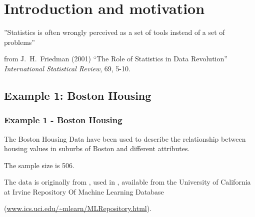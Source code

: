 \documentclass{beamer}
\newcommand{\bs}{\bigskip}
\begin{document}
\section{Introduction and motivation}
\begin{frame}
\begin{center}
{\color{blue}''Statistics is often wrongly perceived as a set of tools instead of a set of problems''}
\end{center}

\bs
\bs

from J.~H.~Friedman (2001) ``The Role of Statistics in Data Revolution'' \textit{International Statistical Review}, 69, 5-10.
\end{frame}

\subsection{Example 1: Boston Housing}

\begin{frame}
\frametitle{Example 1 - Boston Housing}

The Boston Housing Data have
  been used to describe the relationship between housing values in suburbs of
  Boston and different attributes.

\bs

The sample size is 506.

\bs

The data is originally from , used in
,  available from the University of California at Irvine Repository Of Machine Learning
Database 

(\url{www.ics.uci.edu/~mlearn/MLRepository.html}).

\end{frame}
\end{document}
